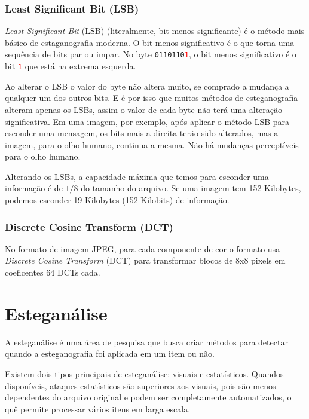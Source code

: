 \subsubsection{Least Significant Bit (LSB)}

\emph{Least Significant Bit} (LSB) (literalmente, bit menos significante) é o método mais básico de estaganografia moderna. O bit menos significativo é o que torna uma sequência de bits par ou impar. No byte \texttt{0110110\textcolor{red}{1}}, o bit menos significativo é o bit \texttt{\textcolor{red}{1}} que está na extrema esquerda.

Ao alterar o LSB o valor do byte não altera muito, se comprado a mudança a qualquer um dos outros bits. E é por isso que muitos métodos de esteganografia alteram apenas os LSBs, assim o valor de cada byte não terá uma alteração significativa. Em uma imagem, por exemplo, após aplicar o método LSB para esconder uma mensagem, os bits mais a direita terão sido alterados, mas a imagem, para o olho humano, continua a mesma. Não há mudanças perceptíveis para o olho humano.

Alterando os LSBs, a capacidade máxima que temos para esconder uma informação é de $1/8$ do tamanho do arquivo. Se uma imagem tem 152 Kilobytes, podemos esconder 19 Kilobytes (152 Kilobits) de informação.


\subsubsection{Discrete Cosine Transform (DCT)}

No formato de imagem JPEG, para cada componente de cor o formato usa \emph{Discrete Cosine Transform} (DCT) para transformar blocos de 8x8 pixels em coeficentes 64 DCTs cada. \cite{provos_hide_2003}


\section{Esteganálise}

A esteganálise é uma área de pesquisa que busca criar métodos para detectar quando a esteganografia foi aplicada em um item ou não.

Existem dois tipos principais de esteganálise: visuais e estatísticos. Quandos disponíveis, ataques estatísticos são superiores aos visuais, pois são menos dependentes do arquivo original e podem ser completamente automatizados, o quê permite processar vários itens em larga escala. \cite{westfeld1999attacks}

